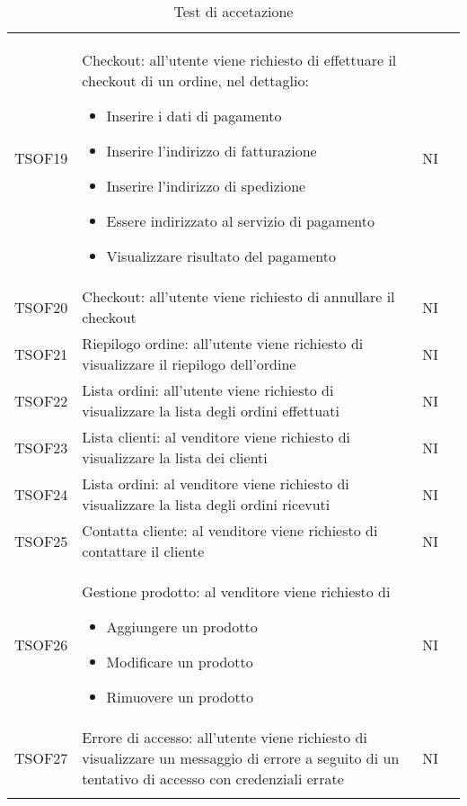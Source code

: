 \begin{center}
\begin{longtable}[!h]{p{50px} p{245px} p{75px} p{50px}}
        TSOF19  & Checkout: all'utente viene richiesto di effettuare il checkout di un ordine, nel dettaglio: \begin{itemize} \item Inserire i dati di pagamento \item Inserire l'indirizzo di fatturazione \item Inserire l'indirizzo di spedizione \item Essere indirizzato al servizio di pagamento \item Visualizzare risultato del pagamento \end{itemize} & NI \\
        TSOF20  & Checkout: all'utente viene richiesto di annullare il checkout & NI \\
        TSOF21  & Riepilogo ordine: all'utente viene richiesto di visualizzare il riepilogo dell'ordine & NI \\
        TSOF22  & Lista ordini: all'utente viene richiesto di visualizzare la lista degli ordini effettuati  & NI \\
        TSOF23  & Lista clienti: al venditore viene richiesto di visualizzare la lista dei clienti & NI \\
        TSOF24  & Lista ordini: al venditore viene richiesto di visualizzare la lista degli ordini ricevuti & NI \\
        TSOF25  & Contatta cliente: al venditore viene richiesto di contattare il cliente & NI \\
        TSOF26  & Gestione prodotto: al venditore viene richiesto di \begin{itemize} \item Aggiungere un prodotto \item Modificare un prodotto \item Rimuovere un prodotto \end{itemize} & NI \\
        TSOF27  & Errore di accesso: all'utente viene richiesto di visualizzare un messaggio di errore a seguito di un tentativo di accesso con credenziali errate & NI \\
        \rowcolor{white}\caption{Test di accetazione}            
    \end{longtable}    
\end{center}